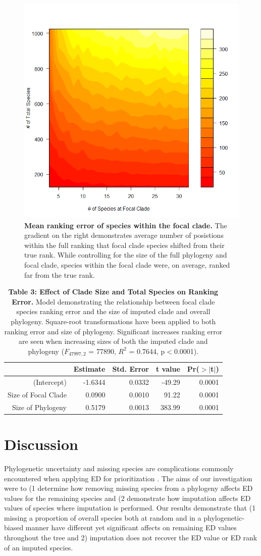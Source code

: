 \documentclass[12pt,english]{article}
\begin{document}
\begin{figure}[!ht]
  \center
  \includegraphics[width=.5\textwidth]{rankingError.png}
  \caption{\textbf{Mean ranking error of species within the focal clade.} The 
  gradient on the right demonstrates average number of posistions within the 
  full ranking that focal clade species shifted from their true rank.
  While controlling for the size of the full phylogeny and focal clade, species 
  within the focal clade were, on average, ranked far from the true rank. }
  \label{rankingError}
\end{figure}

\begin{table}[ht]
  \centering
  \begin{tabular}{rrrrr}
    \hline
   & Estimate & Std. Error & t value & Pr($>$$|$t$|$) \\
    \hline
  (Intercept) & -1.6344 & 0.0332 & -49.29 & 0.0001 \\
    Size of Focal Clade & 0.0900 & 0.0010 & 91.22 & 0.0001 \\
    Size of Phylogeny & 0.5179 & 0.0013 & 383.99 & 0.0001 \\
     \hline
     \hline
  \end{tabular}
  \caption*{\textbf{Table 3: Effect of Clade Size and Total Species on Ranking
  Error.} Model demonstrating the relationship between focal clade species
  ranking error and the size of imputed clade and overall phylogeny. Square-root
  transformations have been applied to both ranking error and size of phylogeny.
  Significant increases ranking error are seen when increasing sizes of both the
  imputed clade and phylogeny ($F_{47997, 2}$ = 77890, $R^{2}$ = 0.7644,
  p$<$0.0001).}
  \end{table}

\clearpage
\section*{Discussion}
Phylogenetic uncertainty and missing species are complications commonly
encountered when applying ED for prioritization \autocite{Isaac2007}. The aims
of our investigation were to (1 determine how removing missing species from a
phylogeny affects ED values for the remaining species and (2 demonstrate how
imputation affects ED values of species where imputation is performed. Our
results demonstrate that (1 missing a proportion of overall species both at
random and in a phylogenetic-biased manner have different yet significant
affects on remaining ED values throughout the tree and 2) imputation does not
recover the ED value or ED rank of an imputed species.
\end{document}
